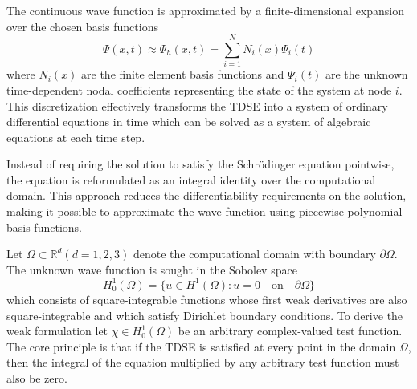 \documentclass[11pt]{article}
\begin{document}
The continuous wave function is approximated by a finite-dimensional expansion over the chosen basis functions
\begin{equation}
	\Psi (x,t) \approx \Psi_h (x,t) = \sum_{i=1}^N N_i(x) \Psi_i (t)
\end{equation}
where $N_i(x)$ are the finite element basis functions and $\Psi_i (t)$ are the unknown time-dependent nodal coefficients representing the state of the system at node $i$. This discretization effectively transforms the TDSE into a system of ordinary differential equations in time which can be solved as a system of algebraic equations at each time step.

Instead of requiring the solution to satisfy the Schrödinger equation pointwise, the equation is reformulated as an integral identity over the computational domain. This approach reduces the differentiability requirements on the solution, making it possible to approximate the wave function using piecewise polynomial basis functions.

Let $\Omega \subset \mathbb{R}^{d} (d=1,2,3)$ denote the computational domain with boundary $ \partial\Omega$. The unknown wave function is sought in the Sobolev space
\begin{equation}
	H_0^1 (\Omega) = \{ u \in H^1 (\Omega) : u = 0 \quad \text{on} \quad \partial \Omega \}
\end{equation}
which consists of square-integrable functions whose first weak derivatives are also square-integrable and which satisfy Dirichlet boundary conditions. To derive the weak formulation let $\chi \in H_0^1(\Omega)$ be an arbitrary complex-valued test function. The core principle is that if the TDSE is satisfied at every point in the domain $\Omega$, then the integral of the equation multiplied by any arbitrary test function must also be zero.
\end{document}
